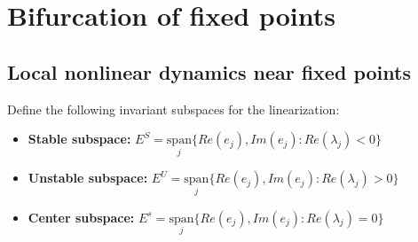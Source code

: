 \section{Bifurcation of fixed points}

\subsection{Local nonlinear dynamics near fixed points}

Define the following invariant subspaces for the linearization:
\begin{itemize}
    \item \textbf{Stable subspace:} $E^S=\underset{j}{\mathrm{span}} \{Re(e_j), Im(e_j): Re(\lambda_j)<0\}$
    \item \textbf{Unstable subspace:} $E^U=\underset{j}{\mathrm{span}} \{Re(e_j), Im(e_j): Re(\lambda_j)>0\}$ 
    \item \textbf{Center subspace:} $E^s=\underset{j}{\mathrm{span}} \{Re(e_j), Im(e_j): Re(\lambda_j)=0\}$ 
\end{itemize}

